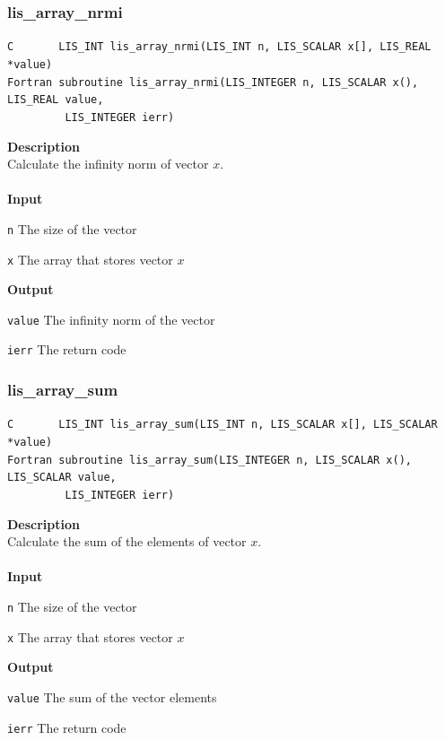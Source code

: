 \documentclass[a4paper]{article}
\newcommand{\namelistlabel}[1]{\mbox{#1}\hfill}
\newenvironment{namelist}[1]{%
\begin{list}{}
  {\let\makelabel\namelistlabel
  \settowidth{\labelwidth}{#1}
  \setlength{\leftmargin}{1.1\labelwidth}}
  }{%
\end{list}}
\begin{document}
\subsubsection{lis\_array\_nrmi}
\begin{screen}
\verb|C       LIS_INT lis_array_nrmi(LIS_INT n, LIS_SCALAR x[], LIS_REAL *value)|\\
\verb|Fortran subroutine lis_array_nrmi(LIS_INTEGER n, LIS_SCALAR x(), LIS_REAL value,|\\
\verb|         LIS_INTEGER ierr)|
\end{screen}
{\bf Description}\\
\indent
Calculate the infinity norm of vector $x$.
\\ \\
\noindent
{\bf Input}
\begin{namelist}{XXXXXXXXXXXXXXXXXXXX}
\item[\tt n] The size of the vector
\item[\tt x] The array that stores vector $x$
\end{namelist}
{\bf Output}
\begin{namelist}{XXXXXXXXXXXXXXXXXXXX}
\item[\tt value] The infinity norm of the vector
\item[\tt ierr] The return code
\end{namelist}

\newpage
\subsubsection{lis\_array\_sum}
\begin{screen}
\verb|C       LIS_INT lis_array_sum(LIS_INT n, LIS_SCALAR x[], LIS_SCALAR *value)|\\
\verb|Fortran subroutine lis_array_sum(LIS_INTEGER n, LIS_SCALAR x(), LIS_SCALAR value,|\\
\verb|         LIS_INTEGER ierr)|
\end{screen}
{\bf Description}\\
\indent
Calculate the sum of the elements of vector $x$.
\\ \\
\noindent
{\bf Input}
\begin{namelist}{XXXXXXXXXXXXXXXXXXXX}
\item[\tt n] The size of the vector
\item[\tt x] The array that stores vector $x$
\end{namelist}
{\bf Output}
\begin{namelist}{XXXXXXXXXXXXXXXXXXXX}
\item[\tt value] The sum of the vector elements 
\item[\tt ierr] The return code
\end{namelist}
\end{document}
